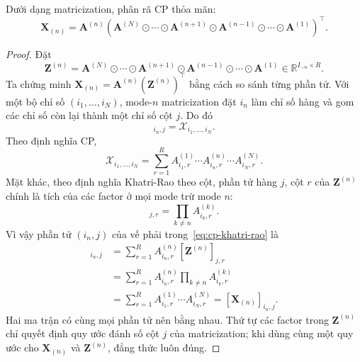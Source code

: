 \begin{proposition}
Dưới dạng matricization, phân rã CP thỏa mãn:
\begin{equation}
    \mathbf{X}_{(n)} = \mathbf{A}^{(n)}\left(\mathbf{A}^{(N)} \odot \cdots \odot \mathbf{A}^{(n+1)} \odot \mathbf{A}^{(n-1)} \odot \cdots \odot \mathbf{A}^{(1)}\right)^\top.
\label{eq:cp-khatri-rao}
\end{equation}
\end{proposition}

\begin{proof}
Đặt
\begin{equation}
    \mathbf{Z}^{(n)}
    =
    \mathbf{A}^{(N)} \odot \cdots \odot \mathbf{A}^{(n+1)}
    \odot \mathbf{A}^{(n-1)} \odot \cdots \odot \mathbf{A}^{(1)}
    \in \mathbb{R}^{I_{-n}\times R}.
\end{equation}
Ta chứng minh $\mathbf{X}_{(n)}=\mathbf{A}^{(n)}(\mathbf{Z}^{(n)})^\top$ bằng cách so sánh từng phần tử. Với một bộ chỉ số $(i_1,\ldots,i_N)$, mode-$n$ matricization đặt $i_n$ làm chỉ số hàng và gom các chỉ số còn lại thành một chỉ số cột $j$. Do đó
\begin{equation}
    [\mathbf{X}_{(n)}]_{i_n,j}
    =
    \mathcal{X}_{i_1,\ldots,i_N}.
\end{equation}
Theo định nghĩa CP,
\begin{equation}
    \mathcal{X}_{i_1,\ldots,i_N}
    =
    \sum_{r=1}^{R}
    A^{(1)}_{i_1,r}\cdots A^{(n)}_{i_n,r}\cdots A^{(N)}_{i_N,r}.
\end{equation}
Mặt khác, theo định nghĩa Khatri-Rao theo cột, phần tử hàng $j$, cột $r$ của $\mathbf{Z}^{(n)}$ chính là tích của các factor ở mọi mode trừ mode $n$:
\begin{equation}
    [\mathbf{Z}^{(n)}]_{j,r}
    =
    \prod_{k\neq n} A^{(k)}_{i_k,r}.
\end{equation}
Vì vậy phần tử $(i_n,j)$ của vế phải trong~\eqref{eq:cp-khatri-rao} là
\begin{align}
    [\mathbf{A}^{(n)}(\mathbf{Z}^{(n)})^\top]_{i_n,j}
    &=
    \sum_{r=1}^{R}
    A^{(n)}_{i_n,r}[\mathbf{Z}^{(n)}]_{j,r} \\
    &=
    \sum_{r=1}^{R}
    A^{(n)}_{i_n,r}\prod_{k\neq n} A^{(k)}_{i_k,r} \\
    &=
    \sum_{r=1}^{R}
    A^{(1)}_{i_1,r}\cdots A^{(N)}_{i_N,r}
    =
    [\mathbf{X}_{(n)}]_{i_n,j}.
\end{align}
Hai ma trận có cùng mọi phần tử nên bằng nhau. Thứ tự các factor trong $\mathbf{Z}^{(n)}$ chỉ quyết định quy ước đánh số cột $j$ của matricization; khi dùng cùng một quy ước cho $\mathbf{X}_{(n)}$ và $\mathbf{Z}^{(n)}$, đẳng thức luôn đúng.
\end{proof}

